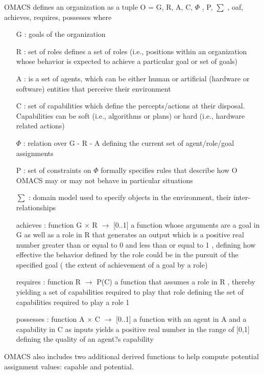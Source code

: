OMACS defines an organization as a tuple O = \textlangle{} G, R, A, C, $\varPhi$ , P, $\sum$ ,
oaf, achieves, requires, possesses \textrangle{}
where
\begin{itemize}

\item[ G ]  
: goals of the organization 
\item[ R ]  
: set of roles  defines a set of roles (i.e., positions within an organization whose behavior
 is expected to achieve a particular goal or set of goals)
\item[ A ]  
: is a set of agents, which can be either human or artificial (hardware or software)
 entities that perceive their environment
\item[ C ]  
: set of capabilities  which define the percepts/actions at their disposal. Capabilities can be soft 
(i.e., algorithms or plans) or hard (i.e., hardware related actions)
\item[  $\varPhi$ ]  
:  relation over G - R - A defining the current set of agent/role/goal assignments
\item[ P ] 
:  set of constraints on  $\varPhi$  formally specifies rules that describe how O OMACS may or may not 
 behave in particular situations
\item[ $\sum$ ]  
: domain model used to specify objects in the environment, their inter-
relationships
\item[ achieves ]   
: function G $\times$ R $\rightarrow$ {[}0..1{]} a function whose arguments are a goal in G   as well
 as a role in R   that generates an output which is a positive real number greater  than or equal to 0 
 and less than or equal to 1 , defining how effective the behavior
 defined by the role could be in the pursuit of the specified goal   (  the extent of achievement of a goal by a role)
\item[requires] 
: function R $\rightarrow$ P(C)    a function that assumes a role in R  , thereby yielding a set 
of capabilities required to play that role  defining the set of capabilities required to play a role 1
\item[possesses] 
:   function A $\times$ C $\rightarrow$ {[}0..1{]} a function with an agent in A   and a capability in C 
  as inputs yields a positive real number in the range of [0,1] defining the quality of an agent?s capability



\end{itemize}
OMACS also includes two additional derived functions to help compute potential assignment values: 
capable and potential.

